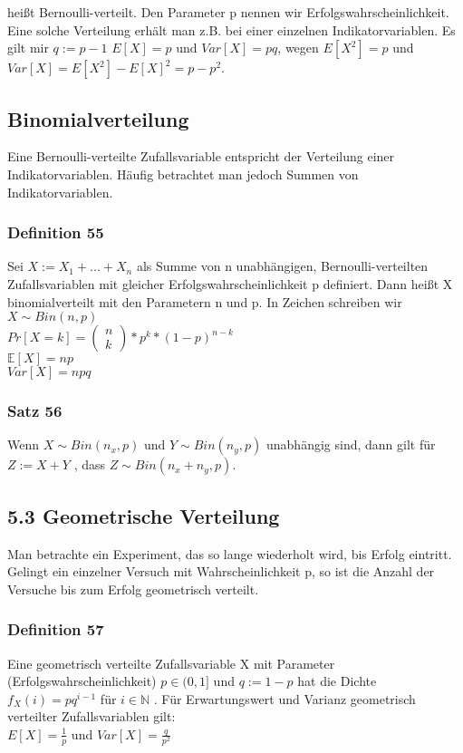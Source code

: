 \documentclass[11pt]{article}
\begin{document}
{heißt Bernoulli-verteilt. Den Parameter p nennen wir Erfolgswahrscheinlichkeit.
Eine solche Verteilung erhält man z.B. bei einer einzelnen Indikatorvariablen. Es gilt mir \(q := p-1\)
\(E[X] = p\) und \(Var[X] = pq\),
wegen \(E[X^2] = p\) und \(Var[X] = E[X^2] - E[X]^2 = p - p^2\).
\subsection{Binomialverteilung}
\label{sec:org5841913}
Eine Bernoulli-verteilte Zufallsvariable entspricht der Verteilung einer Indikatorvariablen. Häufig betrachtet man jedoch Summen von Indikatorvariablen.
\subsubsection{Definition 55}
\label{sec:org1a09e02}
Sei \(X := X_1 + ... + X_n\) als Summe von n unabhängigen, Bernoulli-verteilten Zufallsvariablen mit gleicher Erfolgswahrscheinlichkeit p definiert. Dann heißt X binomialverteilt mit den Parametern n und p. In Zeichen schreiben wir
\(X \sim Bin(n,p)\) \\
\(Pr[X=k] = \begin{pmatrix} n \\ k \end{pmatrix} * p^k * (1-p)^{n-k}\) \\
\(\mathbb{E}[X] = np\) \\
\(Var[X] = npq\)
\subsubsection{Satz 56}
\label{sec:org0c8ac72}
Wenn \(X \sim Bin(n_x, p)\) und \(Y \sim Bin(n_y, p)\) unabhängig sind, dann gilt für \(Z := X + Y\) , dass \(Z \sim Bin(n_x + n_y, p)\).
\subsection{5.3 Geometrische Verteilung}
\label{sec:orga5245bb}
Man betrachte ein Experiment, das so lange wiederholt wird, bis Erfolg eintritt. Gelingt ein einzelner Versuch mit Wahrscheinlichkeit p, so ist die Anzahl der Versuche bis zum Erfolg geometrisch verteilt.
\subsubsection{Definition 57}
\label{sec:org40c7cc9}
Eine geometrisch verteilte Zufallsvariable X mit Parameter (Erfolgswahrscheinlichkeit)
\(p \in (0, 1]\) und \(q := 1 - p\) hat die Dichte
\(f_X(i) = pq^{i-1}\) für \(i \in \mathbb{N}\) .
Für Erwartungswert und Varianz geometrisch verteilter Zufallsvariablen gilt: \\
\(E[X] = \frac{1}{p}\) und \(Var[X] = \frac{q}{p^2}\)
}
\end{document}
